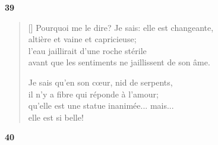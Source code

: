 \documentclass[a4paper,12pt]{book}
\begin{document}
\bigskip

\begin{center}
  \textbf{39}
\end{center}

\settowidth{\versewidth}{Pourquoi me le dire? Je sais: elle est changeante,}

\begin{verse}[\versewidth]
  Pourquoi me le dire? Je sais: elle est changeante, \\
  altière et vaine et capricieuse; \\
  l'eau jaillirait d'une roche stérile \\
  avant que les sentiments ne jaillissent de son âme.

  Je sais qu'en son cœur, nid de serpents, \\
  il n'y a fibre qui réponde à l'amour; \\
  qu'elle est une statue inanimée... mais... \\
  elle est si belle!
\end{verse}

\bigskip

\begin{center}
  \textbf{40}
\end{center}

\settowidth{\versewidth}{Sa main dans mes mains,}
\end{document}
